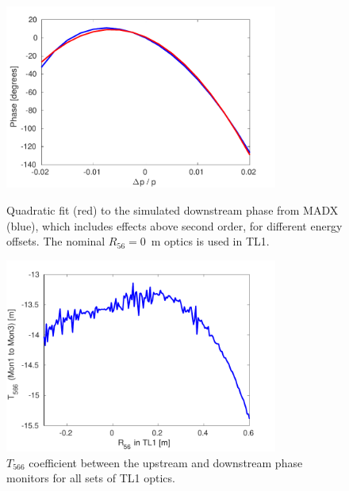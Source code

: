 \begin{figure}
  \centering
  \includegraphics[width=0.8\textwidth]{Figures/propagation/madxT566Fit}
  \caption{Quadratic fit (red) to the simulated downstream phase from MADX (blue), which includes effects above second order, for different energy offsets. The nominal \(R_{56}=0\)~m optics is used in TL1.}
  \label{f:madxT566Fit}

  \includegraphics[width=0.8\textwidth]{Figures/propagation/t566TotVsr56TL1}
  \caption{\(T_{566}\) coefficient between the upstream and downstream phase monitors for all sets of TL1 optics.}
  \label{f:t566TotVsr56TL1}
\end{figure}


